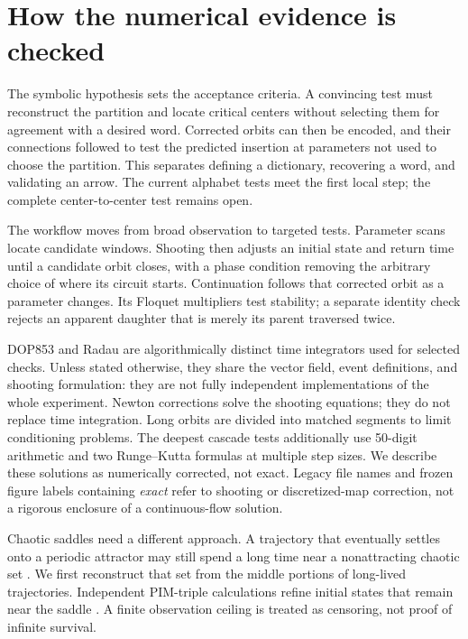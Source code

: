 \section{How the numerical evidence is checked}
\label{sec:methods}

The symbolic hypothesis sets the acceptance criteria. A convincing test must
reconstruct the partition and locate critical centers without selecting them
for agreement with a desired word. Corrected orbits can then be encoded, and
their connections followed to test the predicted insertion at parameters
not used to choose the partition. This separates defining a dictionary,
recovering a word, and validating an arrow. The current alphabet tests meet
the first local step; the complete center-to-center test remains open.

The workflow moves from broad observation to targeted tests. Parameter scans
locate candidate windows. Shooting then adjusts an initial state and return
time until a candidate orbit closes, with a phase condition removing the
arbitrary choice of where its circuit starts. Continuation follows that
corrected orbit as a parameter changes. Its Floquet multipliers test
stability; a separate identity check rejects an apparent daughter that is
merely its parent traversed twice.

DOP853 and Radau are algorithmically distinct time integrators used for
selected checks. Unless stated otherwise, they share the vector field,
event definitions, and shooting formulation: they are not fully independent
implementations of the whole experiment.
Newton corrections solve the shooting equations; they do not replace time
integration. Long orbits are divided into matched segments to limit
conditioning problems. The deepest cascade tests additionally use
50-digit arithmetic and two Runge--Kutta formulas at multiple step sizes.
We describe these solutions as numerically corrected, not exact. Legacy
file names and frozen figure labels containing \emph{exact} refer to
shooting or discretized-map correction, not a rigorous enclosure of a
continuous-flow solution.

Chaotic saddles need a different approach. A trajectory that eventually
settles onto a periodic attractor may still spend a long time near a
nonattracting chaotic set \citep{kantz1985repellers}. We first reconstruct
that set from the middle portions of long-lived trajectories. Independent
PIM-triple calculations refine initial states that remain near the saddle
\citep{nusse1989procedure}. A finite observation ceiling is treated as
censoring, not proof of infinite survival.

